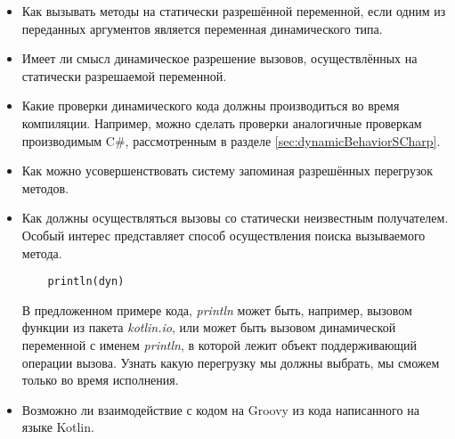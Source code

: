 \begin{itemize}
    \item Как вызывать методы на статически разрешённой переменной, если одним из переданных аргументов является переменная динамического типа.
    \item Имеет ли смысл динамическое разрешение вызовов, осуществлённых на статически разрешаемой переменной.
    \item Какие проверки динамического кода должны производиться во время компиляции.
    Например, можно сделать проверки аналогичные проверкам производимым C\#, рассмотренным в разделе \ref{sec:dynamicBehaviorSCharp}. 
    \item Как можно усовершенствовать систему запоминая разрешённых перегрузок методов.
    \item Как должны осуществляться вызовы со статически неизвестным получателем. Особый интерес представляет способ осуществления поиска вызываемого метода. 
    \begin{verbatim}
    println(dyn)
\end{verbatim}
В предложенном примере кода, \textit{println} может быть, например, вызовом функции из пакета \textit{kotlin.io}, или может быть вызовом динамической переменной с именем \textit{println}, в которой лежит объект поддерживающий операции вызова. Узнать какую перегрузку мы должны выбрать, мы сможем только во время исполнения.
    \item Возможно ли взаимодействие с кодом на Groovy из кода написанного на языке Kotlin.
\end{itemize}